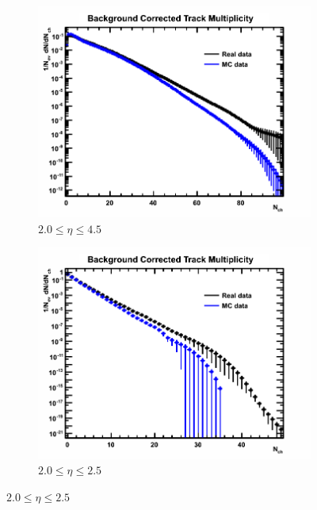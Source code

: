 \begin{figure}[H]
	\centering
	\begin{subfigure}{0.32\textwidth}
		\includegraphics[width=\textwidth]{Chapters/multiplicity/charged_particle_event_multiplicity/images/background_correction_comparison/2_0-4_5.png}
		\caption{$2.0 \le \eta \le 4.5$}
	\end{subfigure}
	\begin{subfigure}{0.32\textwidth}
		\includegraphics[width=\textwidth]{Chapters/multiplicity/charged_particle_event_multiplicity/images/background_correction_comparison/2_0-2_5.png}
		\caption{$2.0 \le \eta \le 2.5$}
	\end{subfigure}

\end{figure}
